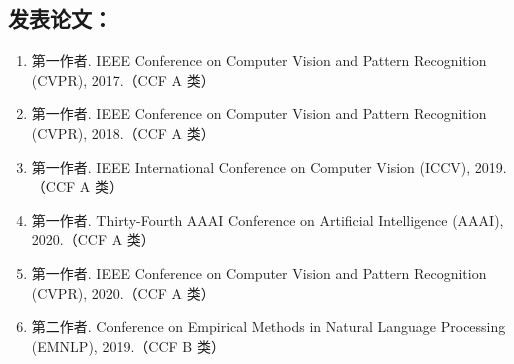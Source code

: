 \begin{publications}



 

\section*{发表论文：}

\begin{enumerate}
\item{
第一作者. IEEE Conference on Computer Vision and Pattern Recognition (CVPR), 2017.（CCF A 类）
}

\item{
第一作者. IEEE Conference on Computer Vision and Pattern Recognition (CVPR), 2018.（CCF A 类）
}

\item{
第一作者. IEEE International Conference on Computer Vision (ICCV), 2019.（CCF A 类）
}

\item{
第一作者. Thirty-Fourth AAAI Conference on Artificial Intelligence (AAAI), 2020.（CCF A 类）
}

\item{
第一作者. IEEE Conference on Computer Vision and Pattern Recognition (CVPR), 2020.（CCF A 类）
}

\item{
第二作者. Conference on Empirical Methods in Natural Language Processing (EMNLP), 2019.（CCF B 类）
}


\end{enumerate}
\end{publications}
